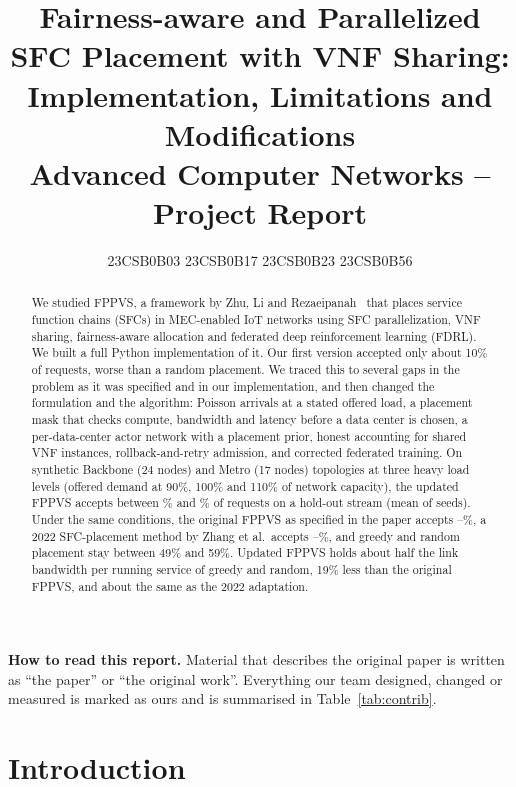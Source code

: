 \documentclass[11pt,a4paper]{article}
\title{\textbf{Fairness-aware and Parallelized SFC Placement with VNF Sharing:\\
Implementation, Limitations and Modifications}\\[4pt]
\large Advanced Computer Networks -- Project Report}
\author{23CSB0B03 \quad 23CSB0B17 \quad 23CSB0B23 \quad 23CSB0B56}
\date{}
\begin{document}
\maketitle

\begin{abstract}
We studied FPPVS, a framework by Zhu, Li and Rezaeipanah~\cite{fppvs} that places
service function chains (SFCs) in MEC-enabled IoT networks using SFC
parallelization, VNF sharing, fairness-aware allocation and federated deep
reinforcement learning (FDRL). We built a full Python implementation of it. Our
first version accepted only about 10\% of requests, worse than a random
placement. We traced this to several gaps in the problem as it was specified
and in our implementation, and then changed the formulation and the algorithm:
Poisson arrivals at a stated offered load, a placement mask that checks compute,
bandwidth and latency before a data center is chosen, a per-data-center actor
network with a placement prior, honest accounting for shared VNF instances,
rollback-and-retry admission, and corrected federated training. On synthetic
Backbone (24 nodes) and Metro (17 nodes) topologies at three heavy load levels
(offered demand at 90\%, 100\% and 110\% of network capacity), the updated FPPVS
accepts between \fppvsMinAcc\% and \fppvsMaxAcc\% of requests on a hold-out
stream (mean of \numSeeds{} seeds). Under the same conditions, the original FPPVS
as specified in the paper accepts \origMinAcc--\origMaxAcc\%, a 2022 SFC-placement
method by Zhang et al.\ accepts \zhangMinAcc--\zhangMaxAcc\%, and greedy and
random placement stay between 49\% and 59\%. Updated FPPVS holds about half the
link bandwidth per running service of greedy and random, 19\% less than the
original FPPVS, and about the same as the 2022 adaptation.
\end{abstract}

\noindent\textbf{How to read this report.} Material that describes the original
paper is written as ``the paper'' or ``the original work''. Everything our team
designed, changed or measured is marked as ours and is summarised in
Table~\ref{tab:contrib}.

\section{Introduction}
\end{document}
